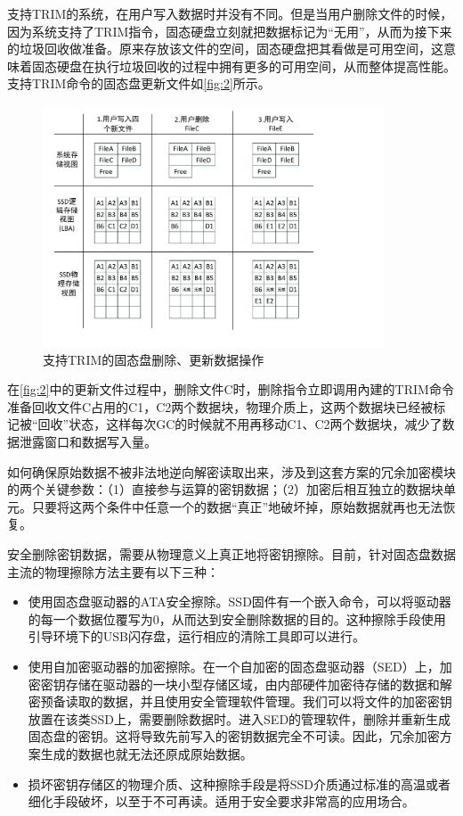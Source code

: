 支持TRIM的系统，在用户写入数据时并没有不同。但是当用户删除文件的时候，因为系统支持了TRIM指令，固态硬盘立刻就把数据标记为“无用”，从而为接下来的垃圾回收做准备。原来存放该文件的空间，固态硬盘把其看做是可用空间，这意味着固态硬盘在执行垃圾回收的过程中拥有更多的可用空间，从而整体提高性能。支持TRIM命令的固态盘更新文件如\autoref{fig:2}所示。
\begin{figure}[H]
	\centering
	\includegraphics[width=4in]{Pics/trim.pdf}
	\caption{支持TRIM的固态盘删除、更新数据操作}\label{fig:2}
\end{figure}
在\autoref{fig:2}中的更新文件过程中，删除文件C时，删除指令立即调用內建的TRIM命令准备回收文件C占用的C1，C2两个数据块，物理介质上，这两个数据块已经被标记被“回收”状态，这样每次GC的时候就不用再移动C1、C2两个数据块，减少了数据泄露窗口和数据写入量。


如何确保原始数据不被非法地逆向解密读取出来，涉及到这套方案的冗余加密模块的两个关键参数：（1）直接参与运算的密钥数据；（2）加密后相互独立的数据块单元。只要将这两个条件中任意一个的数据“真正”地破坏掉，原始数据就再也无法恢复。


安全删除密钥数据，需要从物理意义上真正地将密钥擦除。目前，针对固态盘数据主流的物理擦除方法主要有以下三种：
\begin{itemize}
	\item 使用固态盘驱动器的ATA安全擦除。SSD固件有一个嵌入命令，可以将驱动器的每一个数据位覆写为0，从而达到安全删除数据的目的。这种擦除手段使用引导环境下的USB闪存盘，运行相应的清除工具即可以进行。
	\item 使用自加密驱动器的加密擦除。在一个自加密的固态盘驱动器（SED）上，加密密钥存储在驱动器的一块小型存储区域，由内部硬件加密待存储的数据和解密预备读取的数据，并且使用安全管理软件管理。我们可以将文件的加密密钥放置在该类SSD上，需要删除数据时。进入SED的管理软件，删除并重新生成固态盘的密钥。这将导致先前写入的密钥数据完全不可读。因此，冗余加密方案生成的数据也就无法还原成原始数据。
	\item 损坏密钥存储区的物理介质、这种擦除手段是将SSD介质通过标准的高温或者细化手段破坏，以至于不可再读。适用于安全要求非常高的应用场合。
\end{itemize}


